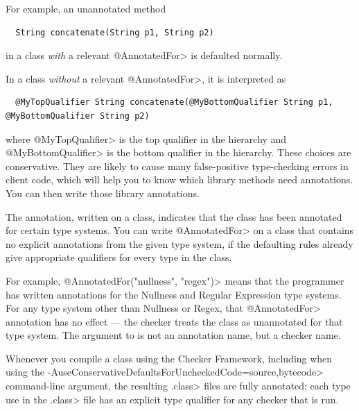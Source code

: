 For example, an unannotated method

\begin{Verbatim}
  String concatenate(String p1, String p2)
\end{Verbatim}

\noindent
in a class \emph{with} a relevant \<@AnnotatedFor> is defaulted normally.

In a class \emph{without} a relevant \<@AnnotatedFor>, it is interpreted as

\begin{Verbatim}
  @MyTopQualifier String concatenate(@MyBottomQualifier String p1, @MyBottomQualifier String p2)
\end{Verbatim}

\noindent
where \<@MyTopQualifier> is the top qualifier in the hierarchy and
\<@MyBottomQualifier> is the bottom qualifier in the hierarchy.
These choices are conservative.  They are likely to cause many
false-positive type-checking errors in client code, which will help you to
know which library methods need annotations.  You can then write those
library annotations.

The  annotation, written on a
class, indicates that the class has been annotated for certain type
systems.
You can write \<@AnnotatedFor> on a class that contains no explicit
annotations from the given type system, if the defaulting rules already
give appropriate qualifiers for every type in the class.

For example, \<@AnnotatedFor(\ttlcb"nullness", "regex"\ttrcb)> means that
the programmer has written annotations for the Nullness and Regular
Expression type systems.
For any type system other than Nullness or Regex, that \<@AnnotatedFor>
annotation has no effect --- the checker treats the class as
unannotated for that type system.
The argument to  is not an
annotation name, but a checker name.

\begin{sloppypar}
Whenever you compile a class using the Checker Framework, including when
using the \<-AuseConservativeDefaultsForUncheckedCode=source,bytecode> command-line
argument, the resulting \<.class> files are fully annotated; each type use
in the \<.class> file has an explicit type qualifier for any checker that
is run.
\end{sloppypar}



